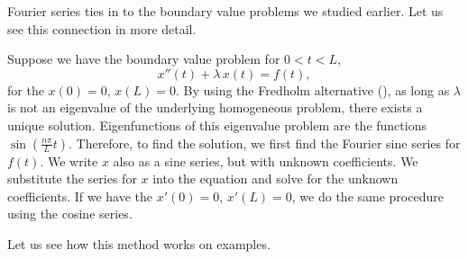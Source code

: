 Fourier series ties in to the boundary value problems
we studied earlier.  Let us see this connection in more detail.

Suppose we have the boundary value problem for $0 < t < L$,
\begin{equation*}
x''(t) + \lambda\, x(t) = f(t) ,
\end{equation*}
for the \emph{}
$x(0) = 0$, $x(L) = 0$.
By using the Fredholm alternative (),
as long as $\lambda$ is not an eigenvalue of the underlying homogeneous
problem, there exists a unique solution.
Eigenfunctions of this eigenvalue problem are the functions
$\sin \left( \frac{n \pi}{L} t \right)$.
Therefore,
to find the solution,
we first find the Fourier sine series for $f(t)$.
We write $x$ also as a sine series, but with unknown coefficients.  
We substitute the series for $x$ into the equation and solve for the unknown
coefficients.
If we have
the \emph{}
$x'(0) = 0$, $x'(L) = 0$, we do the same procedure using the cosine
series.

Let us see how this method works on examples.

